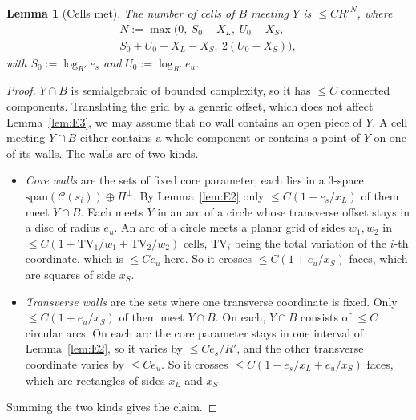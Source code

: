 \documentclass[aps,prx,twocolumn,superscriptaddress,nofootinbib,longbibliography]{revtex4-2}
\theoremstyle{plain}
\newtheorem{lemma}{Lemma}
\theoremstyle{definition}
\theoremstyle{remark}
\begin{document}
\begin{lemma}[Cells met]\label{lem:E4}
The number of cells of $B$ meeting $Y$ is $\le C R'^{N}$, where
\[
\begin{gathered}
N:=\max\big(0,\ S_0-X_L,\ U_0-X_S,\\ S_0+U_0-X_L-X_S,\ 2(U_0-X_S)\big),
\end{gathered}
\]
with $S_0:=\log_{R'}e_s$ and $U_0:=\log_{R'}e_u$.
\end{lemma}
\begin{proof}
$Y\cap B$ is semialgebraic of bounded complexity, so it has $\le C$ connected components. Translating the grid by a generic offset, which does not affect Lemma~\ref{lem:E3}, we may assume that no wall contains an open piece of $Y$. A cell meeting $Y\cap B$ either contains a whole component or contains a point of $Y$ on one of its walls. The walls are of two kinds.
\begin{itemize}\setlength\itemsep{0pt}
\item \emph{Core walls} are the sets of fixed core parameter; each lies in a $3$-space $\mathrm{span}(\mathcal C(s_i))\oplus\Pi^\perp$. By Lemma~\ref{lem:E2} only $\le C(1+e_s/x_L)$ of them meet $Y\cap B$. Each meets $Y$ in an arc of a circle whose transverse offset stays in a disc of radius $e_u$. An arc of a circle meets a planar grid of sides $w_1,w_2$ in $\le C(1+\mathrm{TV}_1/w_1+\mathrm{TV}_2/w_2)$ cells, $\mathrm{TV}_i$ being the total variation of the $i$-th coordinate, which is $\le Ce_u$ here. So it crosses $\le C(1+e_u/x_S)$ faces, which are squares of side $x_S$.
\item \emph{Transverse walls} are the sets where one transverse coordinate is fixed. Only $\le C(1+e_u/x_S)$ of them meet $Y\cap B$. On each, $Y\cap B$ consists of $\le C$ circular arcs. On each arc the core parameter stays in one interval of Lemma~\ref{lem:E2}, so it varies by $\le Ce_s/R'$, and the other transverse coordinate varies by $\le Ce_u$. So it crosses $\le C(1+e_s/x_L+e_u/x_S)$ faces, which are rectangles of sides $x_L$ and $x_S$.
\end{itemize}
Summing the two kinds gives the claim.
\end{proof}
\end{document}
